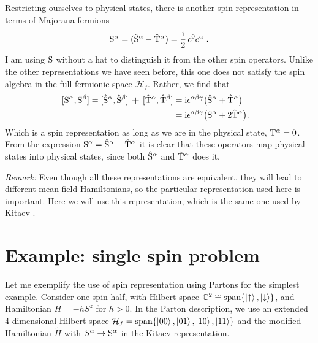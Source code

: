 Restricting ourselves to physical states, there is another spin representation in terms of Majorana fermions
\begin{equation}
    \mathrm{S}^\alpha = (\hat{\mathrm{S}}^\alpha - \hat{\mathrm{T}}^\alpha) = \frac{\mathrm{i}}{2} \,  c^0 c^\alpha \; .
\end{equation}
I am using $\mathrm{S}$ without a hat to distinguish it from the other spin operators.
Unlike the other representations we have seen before, this one does not satisfy the spin algebra in the full fermionic space $\mathcal{H}_f$. Rather, we find that
\begin{equation}
        \hspace*{-3mm}
\begin{split}
[\rmS^\alpha,\rmS^\beta]
    =  [\hat{\rmS}^\alpha ,\hat{\rmS}^\beta]
    \, \bm{+} \,
    [\hat{\rmT}^\alpha,\hat{\rmT}^\beta]
    &= \im \epsilon^{\alpha\beta\gamma} \big( \hat\rmS^\alpha +  \hat\rmT^\alpha \big) \\
    &= \im \epsilon^{\alpha\beta\gamma} \big( \rmS^\alpha + 2 \hat\rmT^\alpha \big) .
\end{split}
\end{equation}
Which is a spin representation as long as we are in the physical state, $\mathrm{T}^\alpha=0$. From the expression $\mathrm{S}^\alpha = \hat{\mathrm{S}}^\alpha - \hat{\mathrm{T}}^\alpha$ it is clear that these operators map physical states into physical states, since both $\hat{\mathrm{S}}^\alpha$ and $\hat{\mathrm{T}}^\alpha$ does it.



\textit{Remark:} Even though all these representations are equivalent, they will lead to different mean-field Hamiltonians, so the particular representation used here is important. Here we will use this representation, which is the same one used by Kitaev \cite{Kitaev_2006}.

\section{Example: single spin problem}
Let me exemplify the use of spin representation using Partons for the simplest example.
Consider one spin-half, with Hilbert space $\mathbb{C}^2\cong \text{span}\{\ket\uparrow,\ket\downarrow\}$, and Hamiltonian $H=-h S^z$ for $h>0$. In the Parton description, we use an extended 4-dimensional Hilbert space $\mathcal{H}_f=\mathrm{span}\{\ket{00},\ket{01},\ket{10},\ket{11}\}$ and the modified Hamiltonian $\tilde H$ with  $ S^\alpha \to \mathrm{S}^\alpha$ in the Kitaev representation.

